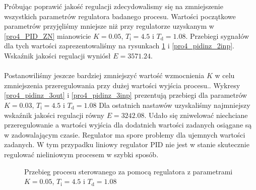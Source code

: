 \indent Próbując poprawić jakość regulacji zdecydowalismy się na zmniejszenie wszystkich 
parametrów regulatora badanego procesu.
Wartości początkowe parametrów przyjęliśmy mniejsze niż przy regulatorze uzyskanym w \ref{pro4_PID_ZN}
mianowicie $K = \num{0,05}$, $T_{\mathrm{i}} = \num{4.5}$ i $T_{\mathrm{d}} = \num{1.08}$. 
Przebiegi sygnałów dla tych wartości zaprezentowaliśmy na rysunkach \ref{pro4_pidinz_2out} i 
\ref{pro4_pidinz_2inp}. Wskaźnik jakości regulacji 
wyniósł $E = \num{3571.24}$. \\
\\
\indent Postanowiliśmy jeszcze bardziej zmniejszyć wartość
wzmocnienia  $K$ w celu zmniejszenia przeregulowania przy dużej wartości wyjścia procesu.. 
Wykresy \ref{pro4_pidinz_3out} i \ref{pro4_pidinz_3inp} 
prezentują przebiegi dla parametrów $K = \num{0,03}$, $T_{\mathrm{i}} = \num{4.5}$ 
i $T_{\mathrm{d}} = \num{1.08}$ Dla ostatnich nastawów uzyskaliśmy najmniejszy 
wskaźnik jakości regulacji równy $E = \num{3242.08}$. Udało się zniwelować 
niechciane przeregulowanie a wartości wyjścia dla dodatnich wartości zadanych osiągane są 
w zadowalającym czasie. Regulator ma spore problemy dla ujemnych wartości zadanych. W tym przypadku
liniowy regulator PID nie jest w stanie skutecznie regulować nieliniowym procesem w szybki sposób.

\begin{figure}[t]
    \centering
    \caption{Przebieg procesu sterowanego za pomocą regulatora z parametrami $K = \num{0,05}$, $T_{\mathrm{i}} = \num{4.5}$ i $T_{\mathrm{d}} = \num{1.08}$}
    \label{pro4_pidinz_2out}
\end{figure}

